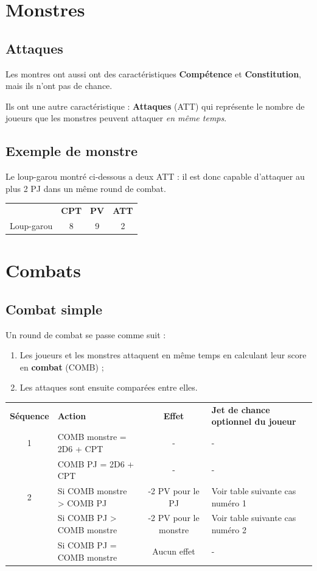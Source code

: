 \documentclass[a4paper, 11pt, twoside]{article}
\begin{document}
\section{Monstres}
\label{sec:org7e35d7c}

\subsection{Attaques}
\label{sec:orgf00846c}

Les montres ont aussi ont des caractéristiques \textbf{Compétence} et \textbf{Constitution}, mais ils n'ont pas de chance.

Ils ont une autre caractéristique : \textbf{Attaques} (ATT) qui représente le nombre de joueurs que les monstres peuvent attaquer \emph{en même temps}.

\subsection{Exemple de monstre}
\label{sec:org2e87664}

Le loup-garou montré ci-dessous a deux ATT : il est donc capable d'attaquer au plus 2 PJ dans un même round de combat.

\begin{longtable}{lccc}
 & \textbf{CPT} & \textbf{PV} & \textbf{ATT}\\
Loup-garou & 8 & 9 & 2\\
\end{longtable}

\section{Combats}
\label{sec:org3c8f936}

\subsection{Combat simple}
\label{sec:orgc374bb5}

Un round de combat se passe comme suit :
\begin{enumerate}
\item Les joueurs et les monstres attaquent en même temps en calculant leur score en \textbf{combat} (COMB) ;
\item Les attaques sont ensuite comparées entre elles.
\end{enumerate}

\begin{longtable}{clcl}
\textbf{Séquence} & \textbf{Action} & \textbf{Effet} & \textbf{Jet de chance optionnel du joueur}\\
1 & COMB monstre = 2D6 + CPT & - & -\\
 & COMB PJ = 2D6 + CPT & - & -\\
2 & Si COMB monstre > COMB PJ & -2 PV pour le PJ & Voir table suivante cas numéro 1\\
 & Si COMB PJ > COMB monstre & -2 PV pour le monstre & Voir table suivante cas numéro 2\\
 & Si COMB PJ = COMB monstre & Aucun effet & -\\
\end{longtable}
\end{document}
